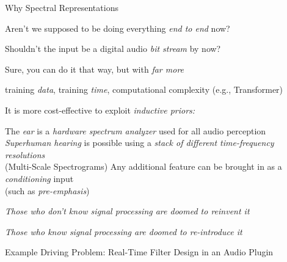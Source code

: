 \begin{slide}[\slideopts,toc={Spectra}]{Why Spectral Representations}

  Aren't we supposed to be doing everything \emph{end to end} now?

  Shouldn't the input be a digital audio \emph{bit stream} by now?

  \begin{itemize}

    \mpitem Sure, you can do it that way, but with \emph{far more}
    \begin{itemize}
      \mpitem training \emph{data},
      \mpitem training \emph{time}, 
      \mpitem computational complexity (e.g., Transformer)
    \end{itemize}
    \mpitem It is more cost-effective to exploit \emph{inductive priors:}
    \begin{itemize}
      \mpitem The \emph{ear} is a \emph{hardware spectrum analyzer} used for all audio perception
      \mpitem \emph{Superhuman hearing} is possible using a \emph{stack of different time-frequency resolutions}\\
      (Multi-Scale Spectrograms)
      \mpitem Any additional feature can be brought in as a \emph{conditioning} input\\
      (such as \emph{pre-emphasis})
    \end{itemize}

  \end{itemize}

  \vspace{-1em}
\maybepause
    \centerline{\textit{Those who don't know signal processing are doomed to reinvent it}}
\maybepause
    \centerline{\textit{Those who know signal processing are doomed to re-introduce it}}

\end{slide}

\begin{slidewhite}[\slideopts,toc={Problem}]{Example Driving Problem: Real-Time Filter Design in an Audio Plugin}

  \vspace{-2em}

\end{slidewhite}

